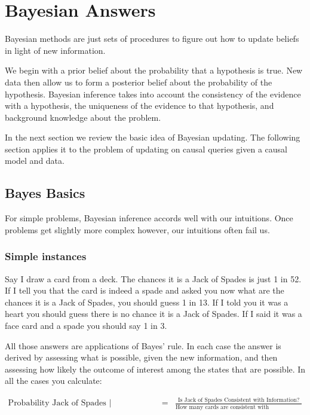 \documentclass[
  12pt,
]{book}
\begin{document}
\hypertarget{bayeschapter}{%
\chapter{Bayesian Answers}\label{bayeschapter}}

Bayesian methods are just sets of procedures to figure out how to update beliefs in light of new information.

We begin with a prior belief about the probability that a hypothesis is true. New data then allow us to form a posterior belief about the probability of the hypothesis. Bayesian inference takes into account the consistency of the evidence with a hypothesis, the uniqueness of the evidence to that hypothesis, and background knowledge about the problem.

In the next section we review the basic idea of Bayesian updating. The following section applies it to the problem of updating on causal queries given a causal model and data.

\hypertarget{bayes-basics}{%
\section{Bayes Basics}\label{bayes-basics}}

For simple problems, Bayesian inference accords well with our intuitions. Once problems get slightly more complex however, our intuitions often fail us.

\hypertarget{simple-instances}{%
\subsection{Simple instances}\label{simple-instances}}

Say I draw a card from a deck. The chances it is a Jack of Spades is just 1 in 52. If I tell you that the card is indeed a spade and asked you now what are the chances it is a Jack of Spades, you should guess 1 in 13. If I told you it was a heart you should guess there is no chance it is a Jack of Spades. If I said it was a face card and a spade you should say 1 in 3.

All those answers are applications of Bayes' rule. In each case the answer is derived by assessing what is possible, given the new information, and then assessing how likely the outcome of interest among the states that are possible. In all the cases you calculate:

\begin{eqnarray}
\text{Probability Jack of Spades | Information} &=& \frac{\text{Is Jack of Spades Consistent with Information?}}{\text{How many cards are consistent with Information?}}
 \end{eqnarray}
\end{document}
